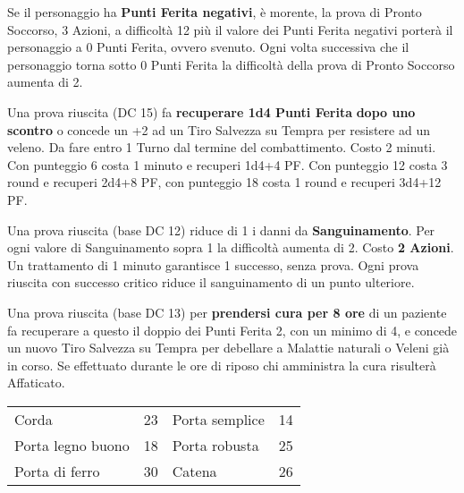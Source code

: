 \documentclass[landscape,10pt,a4paper]{article}
\begin{document}
\begin{multicols}{3}
\begin{dmbox}[title=Pronto Soccorso - pagina \pageref{prontosoccorso}]
Se il personaggio ha \textbf{Punti Ferita negativi}, è morente, la prova di Pronto Soccorso, 3 Azioni, a difficoltà 12 più il valore dei Punti Ferita negativi porterà il personaggio a 0 Punti Ferita, ovvero svenuto. Ogni volta successiva che il personaggio torna sotto 0 Punti Ferita la difficoltà della prova di Pronto Soccorso aumenta di 2.

Una prova riuscita (DC 15) fa \textbf{recuperare 1d4 Punti Ferita} \textbf{dopo uno scontro} o concede un +2 ad un Tiro Salvezza su Tempra per resistere ad un veleno. Da fare entro 1 Turno dal termine del combattimento.  Costo 2 minuti.
Con punteggio 6 costa 1 minuto e recuperi 1d4+4 PF. Con punteggio 12 costa 3 round e recuperi 2d4+8 PF, con punteggio 18 costa 1 round e recuperi 3d4+12 PF.

Una prova riuscita (base DC 12) riduce di 1 i danni da \textbf{Sanguinamento}. Per ogni valore di Sanguinamento sopra 1 la difficoltà aumenta di 2. Costo \textbf{2 Azioni}.
Un trattamento di 1 minuto garantisce 1 successo, senza prova. Ogni prova riuscita con successo critico riduce il sanguinamento di un punto ulteriore.

Una prova riuscita (base DC 13) per \textbf{prendersi cura per 8 ore} di un paziente fa recuperare a questo il doppio dei Punti Ferita 2, con un minimo di 4, e concede un nuovo Tiro Salvezza su Tempra per debellare a Malattie naturali o Veleni già in corso.
Se effettuato durante le ore di riposo chi amministra la cura risulterà Affaticato.
\end{dmbox}

\begin{dmbox}[title=Rompere Oggetti - DC Forzai]
	\begin{tabular}{ll|ll}
		Corda      & 23&Porta semplice         & 14\\
		Porta legno buono  & 18&Porta robusta          & 25\\
		Porta di ferro     & 30&Catena                 & 26 \\
	\end{tabular}
\end{dmbox}


\begin{dmbox}[title=Sfondare le Porte - pagina \pageref{tabellaporte}]
\noindent	{}
\end{dmbox}
\end{multicols}
\end{document}
